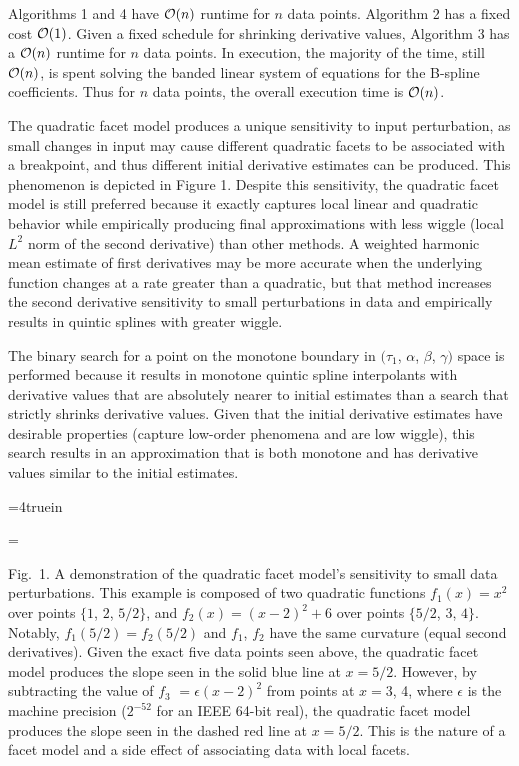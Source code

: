 
Algorithms 1 and 4 have ${\cal O}(n)$ runtime for $n$ data
points. Algorithm 2 has a fixed cost ${\cal O}(1)$. Given a fixed
schedule for shrinking derivative values, Algorithm 3 has a ${\cal
  O}(n)$ runtime for $n$ data points. In execution, the majority of
the time, still ${\cal O}(n)$, is spent solving the banded linear
system of equations for the B-spline coefficients. Thus for $n$ data
points, the overall execution time is ${\cal O}(n)$.

The quadratic facet model produces a unique sensitivity to input
perturbation, as small changes in input may cause different quadratic
facets to be associated with a breakpoint, and thus different initial
derivative estimates can be produced. This phenomenon is depicted in
Figure 1. Despite this sensitivity, the quadratic facet model is still
preferred because it exactly captures local linear and quadratic
behavior while empirically producing final approximations with less
wiggle (local $L^2$ norm of the second derivative) than other methods. A
weighted harmonic mean estimate of first derivatives may be more
accurate when the underlying function changes at a rate greater than a
quadratic, but that method increases the second derivative sensitivity
to small perturbations in data and empirically results in quintic
splines with greater wiggle.

The binary search for a point on the monotone boundary in $(\tau_1$,
$\alpha$, $\beta$, $\gamma)$ space is performed because it results in
monotone quintic spline interpolants with derivative values that are
absolutely nearer to initial estimates than a search that strictly
shrinks derivative values. Given that the initial derivative estimates
have desirable properties (capture low-order phenomena and are low
wiggle), this search results in an approximation that is both monotone
and has derivative values similar to the initial estimates.


\topinsert
\centerline{\epsfxsize=4truein }
{\everymath={\scriptstyle}

\narrower\noindent\rmVIII Fig.\ 1. A demonstration of the quadratic
  facet model's sensitivity to small data perturbations. This example is
  composed of two quadratic functions $f_1(x) = x^2$ over points $\{1$,
  $2$, $5/2\}$, and $f_2(x) = (x-2)^2 + 6$ over points $\{5/2$, $3$,
  $4\}$. Notably, $f_1(5/2) = f_2(5/2)$ and $f_1$, $f_2$ have the same
  curvature (equal second derivatives). Given the exact five data points
  seen above, the quadratic facet model produces the slope seen in the
  solid blue line at $x = 5/2$. However, by subtracting the value of
  $f_3$ $= \epsilon(x-2)^2$ from points at $x = 3$, 4, where $\epsilon$
  is the machine precision ($2^{-52}$ for an IEEE 64-bit real), the
  quadratic facet model produces the slope seen in the dashed red line
  at $x = 5/2$. This is the nature of a facet model and a side effect
  of associating data with local facets.
\par} \endinsert
